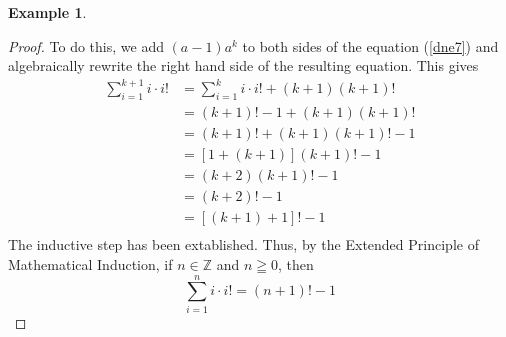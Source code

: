 \documentclass{book}
\theoremstyle{definition}
\newtheorem{example}{Example}[definition]
\theoremstyle{remark}
\newcommand{\bb}[1]{\mathbb{#1}}
\newcommand{\m}{\cdot}
\begin{document}
\begin{example}
\begin{proof}
        To do this, we add $(a-1)a^k$ to both sides of the equation (\ref{dne7}) and algebraically rewrite the right hand side of the resulting equation. This gives
            \begin{align*}
                \sum_{i=1}^{k+1}{i \m i!} & = \sum_{i=1}^{k}{i \m i!} + (k+1)(k+1)! \\
                    & = (k+1)! - 1 + (k+1)(k+1)! \\
                    & = (k+1)! + (k+1)(k+1)! - 1 \\
                    & = [1 + (k+1)](k+1)! - 1 \\
                    & = (k+2)(k+1)! - 1 \\
                    & = (k+2)! - 1 \\
                    & = [(k+1) + 1]! - 1 \\
        \end{align*}
        The inductive step has been extablished. Thus, by the Extended Principle of Mathematical Induction, if $n \in \bb{Z}$ and $n \geqq 0$, then
            \begin{equation*}
                 \sum_{i=1}^{n}{i \m i!} = (n+1)! - 1                
            \end{equation*} 
\end{proof}

\end{example}
\end{document}
